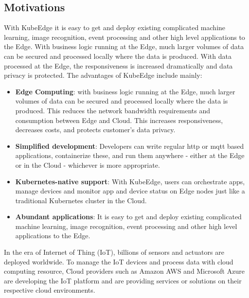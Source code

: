 \subsection{Motivations}
With KubeEdge it is easy to get and deploy existing complicated machine learning, image recognition, event processing and other high level applications to the Edge. With business logic running at the Edge, much larger volumes of data can be secured and processed locally where the data is produced. With data processed at the Edge, the responsiveness is increased dramatically and data privacy is protected.
The advantages of KubeEdge include mainly:
\begin{itemize}
	\item \textbf{Edge Computing}: with business logic running at the Edge, much larger volumes of data can be secured and processed locally where the data is produced. This reduces the network bandwidth requirements and consumption between Edge and Cloud. This increases responsiveness, decreases costs, and protects customer's data privacy.
	\item \textbf{Simplified development}: Developers can write regular http or mqtt based applications, containerize these, and run them anywhere - either at the Edge or in the Cloud - whichever is more appropriate.
	\item \textbf{Kubernetes-native support}: With KubeEdge, users can orchestrate apps, manage devices and monitor app and device status on Edge nodes just like a traditional Kubernetes cluster in the Cloud.
	\item \textbf{Abundant applications}: It is easy to get and deploy existing complicated machine learning, image recognition, event processing and other high level applications to the Edge.
\end{itemize}

In the era of Internet of Thing (IoT), billions of sensors and actuators are deployed worldwide. To manage the IoT devices and process data with cloud computing resource,
Cloud providers such as Amazon AWS and Microsoft Azure are developing the IoT platform and are providing services or solutions on their respective cloud environments.


